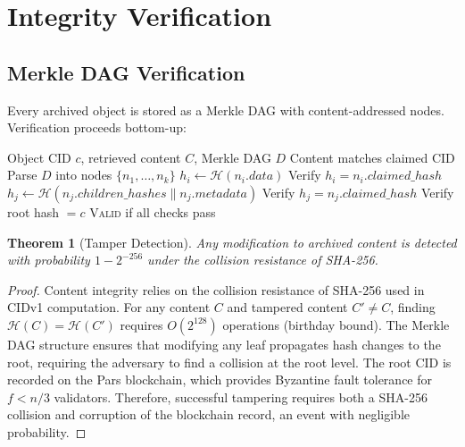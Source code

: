 \documentclass[11pt,a4paper]{article}
\newcommand{\HH}{\mathcal{H}}
\newtheorem{theorem}{Theorem}
\begin{document}
\section{Integrity Verification}

\subsection{Merkle DAG Verification}

Every archived object is stored as a Merkle DAG with content-addressed nodes. Verification proceeds bottom-up:

\begin{algorithm}[H]
\caption{Content Integrity Verification}
\label{alg:verify}
\begin{algorithmic}[1]
\Require Object CID $c$, retrieved content $C$, Merkle DAG $D$
\Ensure Content matches claimed CID
\State Parse $D$ into nodes $\{n_1, \ldots, n_k\}$
    \State $h_i \leftarrow \HH(n_i.\mathit{data})$
    \State Verify $h_i = n_i.\mathit{claimed\_hash}$
\EndFor
{}
    \State $h_j \leftarrow \HH(n_j.\mathit{children\_hashes} \| n_j.\mathit{metadata})$
    \State Verify $h_j = n_j.\mathit{claimed\_hash}$
\EndFor
\State Verify root hash $= c$
\State \Return \textsc{Valid} if all checks pass
\end{algorithmic}
\end{algorithm}

\begin{theorem}[Tamper Detection]
Any modification to archived content is detected with probability $1 - 2^{-256}$ under the collision resistance of SHA-256.
\end{theorem}

\begin{proof}
Content integrity relies on the collision resistance of SHA-256 used in CIDv1 computation. For any content $C$ and tampered content $C' \neq C$, finding $\HH(C) = \HH(C')$ requires $O(2^{128})$ operations (birthday bound). The Merkle DAG structure ensures that modifying any leaf propagates hash changes to the root, requiring the adversary to find a collision at the root level. The root CID is recorded on the Pars blockchain, which provides Byzantine fault tolerance for $f < n/3$ validators. Therefore, successful tampering requires both a SHA-256 collision and corruption of the blockchain record, an event with negligible probability.
\end{proof}
\end{document}
